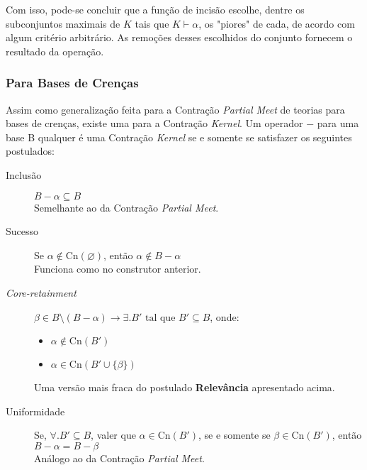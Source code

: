 Com isso, pode-se concluir que a função de incisão escolhe, dentre os subconjuntos maximais de $ K $ tais que $ K \vdash \alpha $, os "piores" de cada, de acordo com algum critério arbitrário. As remoções desses escolhidos do conjunto fornecem o resultado da operação.

\subsubsection{Para Bases de Crenças}

Assim como generalização feita para a Contração \textit{Partial Meet} de teorias para bases de crenças, existe uma para a Contração \textit{Kernel}. Um operador $ - $ para uma base B qualquer é uma Contração \textit{Kernel} se e somente se satisfazer os seguintes postulados:

\begin{description}
	\item[Inclusão] $ B - \alpha \subseteq B$ \\ Semelhante ao da Contração \textit{Partial Meet}.
	\item[Sucesso] Se $ \alpha \notin \text{Cn}(\varnothing) $, então $ \alpha \notin B - \alpha $ \\ Funciona como no construtor anterior.
	\item[\textit{Core-retainment}] $ \beta \in B \setminus (B - \alpha) \to \exists. B' \text{ tal que } B' \subseteq B $, onde:
	\begin{itemize}
		\item $ \alpha \notin \text{Cn}(B') $
		\item $ \alpha \in \text{Cn}(B' \cup \{\beta\}) $ 
	\end{itemize}
	Uma versão mais fraca do postulado \textbf{Relevância} apresentado acima.
	\item[Uniformidade] Se, $ \forall.B' \subseteq B $, valer que $ \alpha \in \text{Cn}(B') $, se e somente se $ \beta \in \text{Cn}(B') $, então $ B - \alpha = B - \beta $ \\
	Análogo ao da Contração \textit{Partial Meet}. 
\end{description}